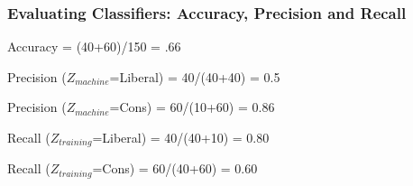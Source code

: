 \documentclass[11pt,compress,professionalfonts]{beamer}
\begin{document}
\begin{frame}[t,fragile]\frametitle{Evaluating Classifiers: Accuracy, Precision and Recall}

\begin{center}
\end{center}

\vspace*{0.5cm}

Accuracy = (40+60)/150 = .66

Precision ($Z_{machine}$=Liberal) = 40/(40+40) = 0.5

Precision ($Z_{machine}$=Cons) = 60/(10+60) = 0.86

Recall ($Z_{training}$=Liberal) = 40/(40+10) = 0.80

Recall ($Z_{training}$=Cons) = 60/(40+60) = 0.60


\end{frame}




\end{document}
